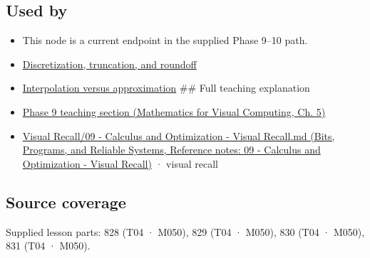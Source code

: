 \subsection{Used by}\label{appendix-32f39e9a3738-used-by}

\begin{itemize}
\item
  This node is a current endpoint in the supplied Phase 9--10 path.
\item
  \hyperref[appendix-6b0648b2b8e8]{Discretization, truncation, and roundoff}
\item
  \hyperref[appendix-0c2a5f69851e]{Interpolation versus approximation} \#\# Full teaching explanation
\item
  \href{../02-Mathematics-for-Visual-Computing/main.pdf\#nameddest=02-foundations-ii-ch021-jacobians-curvature-and-local-approximation}{Phase 9 teaching section (Mathematics for Visual Computing, Ch. 5)}
\item
  \href{../01-Bits-Programs-and-Reliable-Systems/main.pdf\#nameddest=appendix-adf48f5dc5c1}{Visual Recall/09 - Calculus and Optimization - Visual Recall.md (Bits, Programs, and Reliable Systems, Reference notes: 09 - Calculus and Optimization - Visual Recall)} · visual recall
\end{itemize}

\subsection{Source coverage}\label{appendix-32f39e9a3738-source-coverage}

Supplied lesson parts: 828 (T04 · M050), 829 (T04 · M050), 830 (T04 · M050), 831 (T04 · M050).
